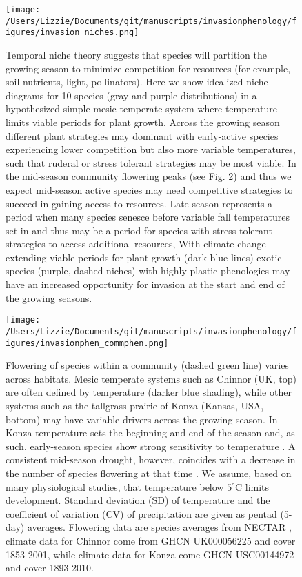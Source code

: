 \documentclass[11pt,a4paper,oneside]{article}
\begin{document}
\newpage



\newpage
\begin{figure}[h!]
\centering
\noindent \texttt{[image: /Users/Lizzie/Documents/git/manuscripts/invasionphenology/figures/invasion\_niches.png]}
\caption{Temporal niche theory suggests that species will partition the growing season to minimize competition for resources (for example, soil nutrients, light, pollinators). Here we show idealized niche diagrams for 10 species (gray and purple distributions) in a hypothesized simple mesic temperate system where temperature limits viable periods for plant growth. Across the growing season different plant strategies may dominant with early-active species experiencing lower competition but also more variable temperatures, such that ruderal or stress tolerant strategies may be most viable. In the mid-season community flowering peaks (see Fig. 2) and thus we expect mid-season active species may need competitive strategies to succeed in gaining access to resources. Late season represents a period when many species senesce before variable fall temperatures set in and thus may be a period for species with stress tolerant strategies to access additional resources, With climate change extending viable periods for plant growth (dark blue lines) exotic species (purple, dashed niches) with highly plastic phenologies may have an increased opportunity for invasion at the start and end of the growing seasons.}
\end{figure}

\newpage
\begin{figure}[h!]
\centering
\noindent \texttt{[image: /Users/Lizzie/Documents/git/manuscripts/invasionphenology/figures/invasionphen\_commphen.png]}
\caption{Flowering of species within a community (dashed green line) varies across habitats. Mesic temperate systems such as Chinnor (UK, top) are often defined by temperature (darker blue shading), while other systems such as the tallgrass prairie of Konza (Kansas, USA, bottom) may have variable drivers across the growing season. In Konza temperature sets the beginning and end of the season and, as such, early-season species show strong sensitivity to temperature \citep{Cook:2012,Craine:2012kl}. A consistent mid-season drought, however, coincides with a decrease in the number of species flowering at that time \citep{Craine:2012kl}. We assume, based on many physiological studies, that temperature below \(5^{\circ}\mathrm{C}\) limits development. Standard deviation (SD) of temperature and the coefficient of variation (CV) of precipitation are given as pentad (5-day) averages. Flowering data are species averages from NECTAR \citep{nectar}, climate data for Chinnor come from GHCN UK000056225 and cover 1853-2001, while climate data for Konza come GHCN USC00144972 and cover 1893-2010.}
\end{figure}
\end{document}
